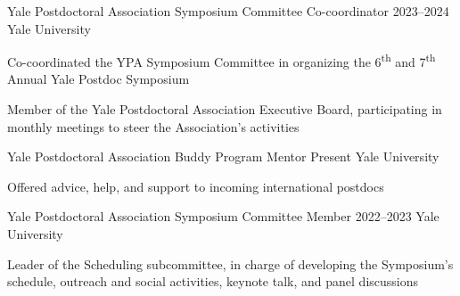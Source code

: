 \begin{cventries}


  \cventry
    {Yale Postdoctoral Association} %
    {Symposium Committee Co-coordinator} %
    {2023--2024} %
    {Yale University} %
    {
      \begin{cvitems} %
        \item {Co-coordinated the YPA Symposium Committee in organizing the 6\textsuperscript{th} and 7\textsuperscript{th} Annual Yale Postdoc Symposium}
        \item {Member of the Yale Postdoctoral Association Executive Board, participating in monthly meetings to steer the Association's activities}
      \end{cvitems}
    }

  \cventry
    {Yale Postdoctoral Association} %
    {Buddy Program Mentor} %
    {Present} %
    {Yale University} %
    {
      \begin{cvitems} %
        \item {Offered advice, help, and support to incoming international postdocs}
      \end{cvitems}
    }

  \cventry
    {Yale Postdoctoral Association} %
    {Symposium Committee Member} %
    {2022--2023} %
    {Yale University} %
    {
      \begin{cvitems} %
        \item {Leader of the Scheduling subcommittee, in charge of developing the Symposium's schedule, outreach and social activities, keynote talk, and panel discussions}
      \end{cvitems}
    }


\end{cventries}
